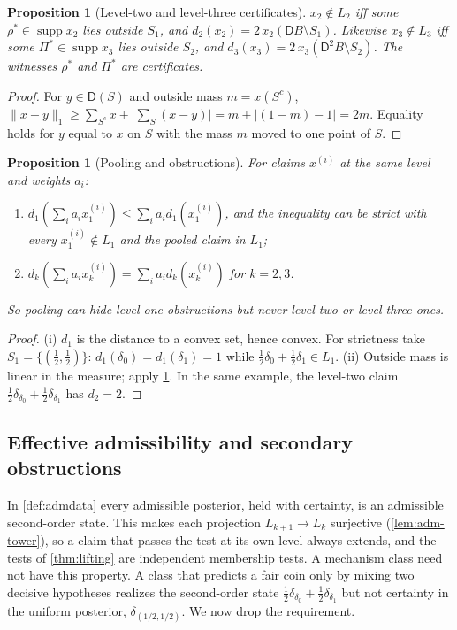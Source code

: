 \documentclass[11pt]{article}
\newtheorem{proposition}[theorem]{Proposition}
\theoremstyle{definition}
\theoremstyle{remark}
\newcommand{\D}{\mathsf{D}}
\begin{document}
\begin{proposition}[Level-two and level-three certificates]\label{prop:cert23}
$x_2\notin L_2$ iff some $\rho^\ast\in\operatorname{supp}x_2$ lies outside $S_1$, and
$d_2(x_2)=2\,x_2(\D B\setminus S_1)$. Likewise $x_3\notin L_3$ iff some
$\Pi^\ast\in\operatorname{supp}x_3$ lies outside $S_2$, and $d_3(x_3)=2\,x_3(\D^2B\setminus S_2)$.
The witnesses $\rho^\ast$ and $\Pi^\ast$ are certificates.
\end{proposition}
\begin{proof}
For $y\in\D(S)$ and outside mass $m=x(S^c)$, $\lVert x-y\rVert_1\ge\sum_{S^c}x+\big|\sum_S(x-y)\big|=
m+|(1-m)-1|=2m$. Equality holds for $y$ equal to $x$ on $S$ with the mass $m$ moved to one point of $S$.
\end{proof}

\begin{proposition}[Pooling and obstructions]\label{prop:pool-obstr}
For claims $x^{(i)}$ at the same level and weights $a_i$:
\begin{enumerate}[label=(\roman*)]
\item $d_1(\sum_ia_ix_1^{(i)})\le\sum_ia_id_1(x_1^{(i)})$, and the inequality can be strict with
  every $x_1^{(i)}\notin L_1$ and the pooled claim in $L_1$;
\item $d_k(\sum_ia_ix_k^{(i)})=\sum_ia_id_k(x_k^{(i)})$ for $k=2,3$.
\end{enumerate}
So pooling can hide level-one obstructions but never level-two or level-three ones.
\end{proposition}
\begin{proof}
(i) $d_1$ is the distance to a convex set, hence convex. For strictness take $S_1=\{(\tfrac12,\tfrac12)\}$:
$d_1(\delta_0)=d_1(\delta_1)=1$ while $\tfrac12\delta_0+\tfrac12\delta_1\in L_1$. (ii) Outside mass is
linear in the measure; apply \cref{prop:cert23}. In the same example, the level-two claim
$\tfrac12\delta_{\delta_0}+\tfrac12\delta_{\delta_1}$ has $d_2=2$.
\end{proof}

\subsection{Effective admissibility and secondary obstructions}\label{sec:secondary}

In \cref{def:admdata} every admissible posterior, held with certainty, is an admissible second-order
state. This makes each projection $L_{k+1}\to L_k$ surjective (\cref{lem:adm-tower}), so a claim that
passes the test at its own level always extends, and the tests of \cref{thm:lifting} are independent
membership tests. A mechanism class need not have this property. A class that predicts a fair coin
only by mixing two decisive hypotheses realizes the second-order state
$\tfrac12\delta_{\delta_0}+\tfrac12\delta_{\delta_1}$ but not certainty in the uniform posterior,
$\delta_{(1/2,1/2)}$. We now drop the requirement.
\end{document}
